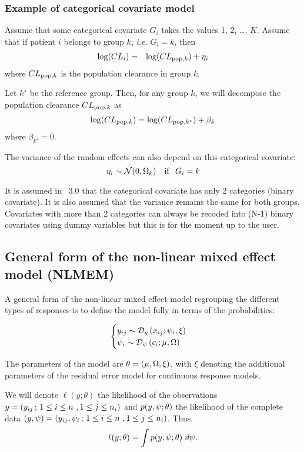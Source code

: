 \subsubsection{Example of categorical covariate model} \label{section_model_catcov}
Assume that some categorical covariate  $G_i$ takes the values 1, 2, \ldots, $K$.
Assume that if patient $i$ belongs to group $k$, {\it i.e.} $G_i=k$, then
\begin{eqnarray*}
\log(CL_i) &=&  \log(CL_{{\rm pop},k}) + \eta_i
\end{eqnarray*}
where $CL_{{\rm pop},k}$ is the population clearance in group $k$.

Let $k^\star$ be the reference group. Then, for any group $k$, we will decompose the population clearance $CL_{{\rm pop},k}$ as
\begin{eqnarray*}
\log(CL_{{\rm pop},k}) = \log(CL_{{\rm pop},k^\star}) + \beta_k
\end{eqnarray*}
where $\beta_{k^\star} = 0$.

The variance of the random effects can also depend on this categorical covariate:
$$ {\eta_i} \sim \mathcal{N}(0, {\Omega}_k) \ \ \ {\rm if } \ \ G_i=k $$

 It is assumed in \monolix~3.0 that the categorical covariate has only 2 categories (binary covariate). It is also assumed that the variance remains the same for both groups. Covariates with more than 2 categories can always be recoded into (N-1) binary covariates using dummy variables but this is for the moment up to the user.

\subsection{General form of the non-linear mixed effect model (NLMEM)}

A general form of the non-linear mixed effect model regrouping the different types of responses is to define the model fully in terms of the probabilities:

$$\begin{cases} 
 y_{ij}  \sim \mathcal{D}_y\left(x_{ij}; \psi_i, \xi \right) \\ 
 \psi_i \sim \mathcal{D}_\psi \left( c_i; \fixed_effect,\IIV \right)
\end{cases}$$

The parameters of the model are $\thetag=(\fixed_effect,\IIV,\xi)$, with $\xi$ denoting the additional parameters of the residual error model for continuous response models.

We will denote $\ell(y;\theta)$ the likelihood of the observations $y =(y_{ij} \, ; \, 1  \leq i \leq n \ , 1
\leq j \leq n_i)$ and $p(y,\psi;\theta) $ the likelihood of the complete data $(y,\psi)= (y_{ij}, \psi_i \, ; \, 1
\leq i \leq n \ , 1 \leq j \leq n_i)$. Thus, $$\ell(y;\theta) = \int p(\yg,\psig;\theta)  \ d\psig .$$
